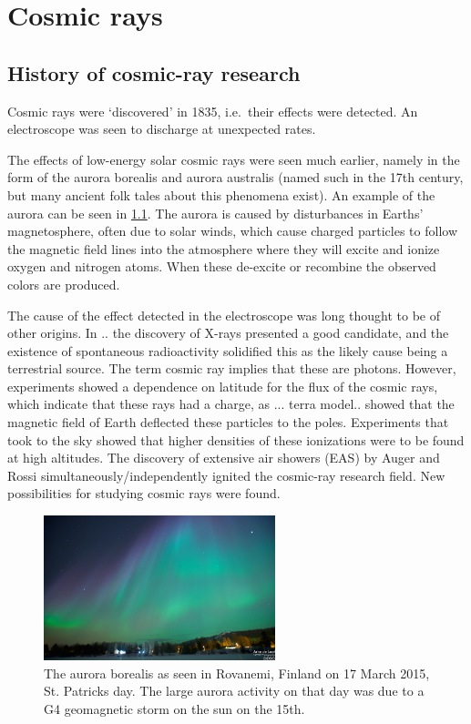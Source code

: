 \chapter{Cosmic rays}
\label{ch:cosmic-rays}


\section{History of cosmic-ray research}

Cosmic rays were `discovered' in 1835, i.e.\ their effects were detected. An electroscope was seen to discharge at unexpected rates.

The effects of low-energy solar cosmic rays were seen much earlier, namely in the form of the aurora borealis and aurora australis (named such in the 17th century, but many ancient folk tales about this phenomena exist). An example of the aurora can be seen in \cref{fig:aurora}. The aurora is caused by disturbances in Earths' magnetosphere, often due to solar winds, which cause charged particles to follow the magnetic field lines into the atmosphere where they will excite and ionize oxygen and nitrogen atoms. When these de-excite or recombine the observed colors are produced.

The cause of the effect detected in the electroscope was long thought to be of other origins. In .. the discovery of X-rays presented a good candidate, and the existence of  spontaneous radioactivity solidified this as the likely cause being a terrestrial source. The term cosmic ray implies that these are photons. However, experiments showed a dependence on latitude for the flux of the cosmic rays, which indicate that these rays had a charge, as ... terra model.. showed that the magnetic field of Earth deflected these particles to the poles. Experiments that took to the sky showed that higher densities of these ionizations were to be found at high altitudes. The discovery of extensive air showers (EAS) by Auger and Rossi simultaneously/independently ignited the cosmic-ray research field. New possibilities for studying cosmic rays were found.

\begin{figure}
    \centering
    \includegraphics[width=0.6\textwidth]{plots/cosmic-rays/aurora.png}
    \caption{The aurora borealis as seen in Rovanemi, Finland on 17 March 2015, St. Patricks day. The large aurora activity on that day was due to a G4 geomagnetic storm on the sun on the 15th.}
    \label{fig:aurora}
\end{figure}


